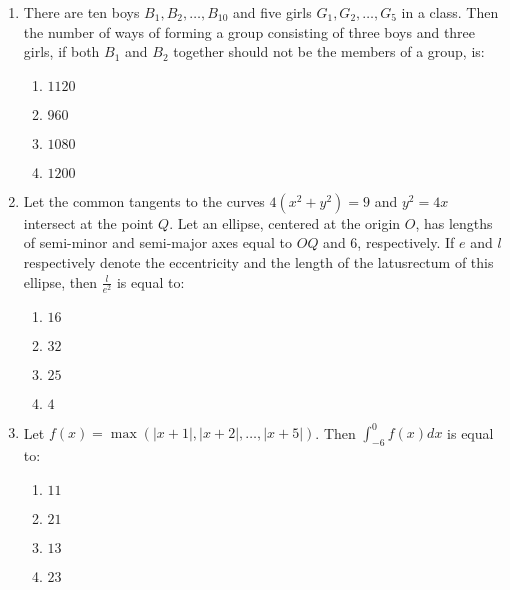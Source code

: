 \documentclass[journal]{IEEEtran}
\newcommand{\brak}[1]{\left( #1 \right)}
\newcommand{\abs}[1]{\left| #1 \right|}
\begin{document}
\begin{enumerate}
    \item There are ten boys $B_1, B_2, \ldots, B_{10}$ and five girls $G_1, G_2, \ldots, G_5$ in a class. Then the number of ways of forming a group consisting of three boys and three girls, if both $B_1$ and $B_2$ together should not be the members of a group, is:

        \begin{multicols}{4}
        \begin{enumerate}
        \item $1120$
        \item $960$
        \item $1080$
        \item $1200$
        \end{enumerate}
        \end{multicols}

    \item Let the common tangents to the curves $4\brak{x^{2}+y^{2}}=9$ and $y^{2}=4x$ intersect at the point $Q$. Let an ellipse, centered at the origin $O$, has lengths of semi-minor and semi-major axes equal to $OQ$ and $6$, respectively. If $e$ and $l$ respectively denote the eccentricity and the length of the latusrectum of this ellipse, then $\frac{l}{e^{2}}$ is equal to:

        \begin{multicols}{4}
        \begin{enumerate}
        \item $16$
        \item $32$
        \item $25$
        \item $4$
        \end{enumerate}
        \end{multicols}

    \item Let $f\brak{x}=\max\brak{\abs{x+1},\abs{x+2},\ldots,\abs{x+5}}$. Then $\int_{-6}^{0}f\brak{x}dx$ is equal to:

        \begin{multicols}{4}
        \begin{enumerate}
        \item $11$
        \item $21$
        \item $13$
        \item $23$
        \end{enumerate}
        \end{multicols}


\end{enumerate}
\end{document}
